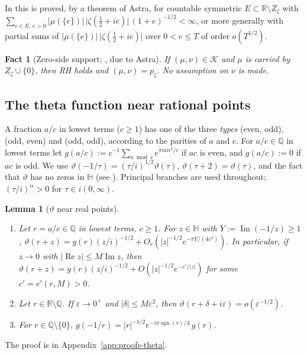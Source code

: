 \documentclass[11pt]{amsart}
\newcommand{\RR}{\mathbb R}
\newcommand{\QQ}{\mathbb Q}
\newcommand{\eps}{\varepsilon}
\renewcommand{\Re}{\operatorname{Re}}
\renewcommand{\Im}{\operatorname{Im}}
\newcommand{\sgn}{\operatorname{sgn}}
\newcommand{\Zz}{Z_\zeta}
\newcommand{\pz}{p_\zeta}
\newcommand{\Kad}{\mathcal K}
\newtheorem{lemma}[theorem]{Lemma}
\newtheorem{fact}[theorem]{Fact}
\theoremstyle{definition}
\theoremstyle{remark}
\numberwithin{equation}{section}
\begin{document}
In \cite[Theorem~3.8]{PaperI} this is proved, by a theorem of Astra, for countable symmetric $E\subset\RR\setminus\Zz$ with
$\sum_{e\in E,\,e>0}\lvert\mu(\{e\})\rvert\,\lvert\zeta(\frac12+ie)\rvert\,(1+e)^{-1/2}<\infty$, or more generally with partial sums of
$\lvert\mu(\{e\})\rvert\,\lvert\zeta(\frac12+ie)\rvert$ over $0<e\le T$ of order $o(T^{1/2})$.

\begin{fact}[Zero-side support; {\cite[Theorem~3.6]{PaperI}}, due to Astra]\label{fact:zerosupport}
If $(\mu,\nu)\in\Kad$ and $\mu$ is carried by $\Zz\cup\{0\}$, then RH holds and $(\mu,\nu)=\pz$. No assumption on $\nu$ is made.
\end{fact}

\subsection{The theta function near rational points}\label{ssec:theta}
A fraction $a/c$ in lowest terms ($c\ge1$) has one of the three \emph{types} (even, odd), (odd, even) and (odd, odd), according
to the parities of $a$ and $c$. For $a/c\in\QQ$ in lowest terms let $g(a/c):=c^{-1}\sum_{n\bmod c}e^{\pi ian^2/c}$ if $ac$ is even, and
$g(a/c):=0$ if $ac$ is odd.
We use $\vartheta(-1/\tau)=(\tau/i)^{1/2}\vartheta(\tau)$, $\vartheta(\tau+2)=\vartheta(\tau)$, and the fact that $\vartheta$ has no zeros in $\mathbb H$
(see \cite[\S3.2]{BRS}). Principal branches are used throughout; $(\tau/i)^\alpha>0$ for $\tau\in i(0,\infty)$.

\begin{lemma}[$\vartheta$ near real points]\label{lem:theta-local}
\begin{enumerate}[label=\textup{(\alph*)}]
\item Let $r=a/c\in\QQ$ in lowest terms, $c\ge1$. For $z\in\mathbb H$ with $Y:=\Im(-1/z)\ge1$,
$\vartheta(r+z)=g(r)(z/i)^{-1/2}+O_r(|z|^{-1/2}e^{-\pi Y/(4c^2)})$. In particular, if $z\to0$ with $|\Re z|\le M\Im z$, then
$\vartheta(r+z)=g(r)(z/i)^{-1/2}+O(|z|^{-1/2}e^{-c'/|z|})$ for some $c'=c'(r,M)>0$.
\item Let $r\in\RR\setminus\QQ$. If $\eps\to0^+$ and $|\delta|\le M\eps^2$, then $\vartheta(r+\delta+i\eps)=o(\eps^{-1/2})$.
\item For $r\in\QQ\setminus\{0\}$, $g(-1/r)=|r|^{-1/2}e^{-i\pi\sgn(r)/4}\,g(r)$.
\end{enumerate}
\end{lemma}

The proof is in Appendix~\ref{app:proofs-theta}.
\end{document}
